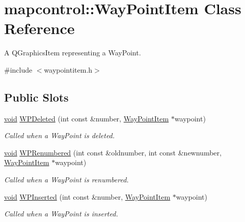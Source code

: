 \hypertarget{classmapcontrol_1_1_way_point_item}{\section{mapcontrol\-:\-:\-Way\-Point\-Item \-Class \-Reference}
\label{classmapcontrol_1_1_way_point_item}
}


\-A \-Q\-Graphics\-Item representing a \-Way\-Point.  




{\ttfamily \#include $<$waypointitem.\-h$>$}

\subsection*{\-Public \-Slots}
\begin{DoxyCompactItemize}
\item 
\hyperlink{group___u_a_v_objects_plugin_ga444cf2ff3f0ecbe028adce838d373f5c}{void} \hyperlink{group___o_p_map_widget_ga4f73652bac019e1b92fc67c4a2403b2b}{\-W\-P\-Deleted} (int const \&number, \hyperlink{classmapcontrol_1_1_way_point_item}{\-Way\-Point\-Item} $\ast$waypoint)
\begin{DoxyCompactList}\small\item\em \-Called when a \-Way\-Point is deleted. \end{DoxyCompactList}\item 
\hyperlink{group___u_a_v_objects_plugin_ga444cf2ff3f0ecbe028adce838d373f5c}{void} \hyperlink{group___o_p_map_widget_ga071a506384379c4aabb30ea5dc0fa4e1}{\-W\-P\-Renumbered} (int const \&oldnumber, int const \&newnumber, \hyperlink{classmapcontrol_1_1_way_point_item}{\-Way\-Point\-Item} $\ast$waypoint)
\begin{DoxyCompactList}\small\item\em \-Called when a \-Way\-Point is renumbered. \end{DoxyCompactList}\item 
\hyperlink{group___u_a_v_objects_plugin_ga444cf2ff3f0ecbe028adce838d373f5c}{void} \hyperlink{group___o_p_map_widget_ga5a663a828366d996f76a646e2cad90ec}{\-W\-P\-Inserted} (int const \&number, \hyperlink{classmapcontrol_1_1_way_point_item}{\-Way\-Point\-Item} $\ast$waypoint)
\begin{DoxyCompactList}\small\item\em \-Called when a \-Way\-Point is inserted. \end{DoxyCompactList}\item 

\end{DoxyCompactItemize}
